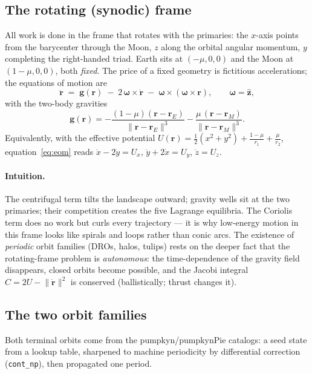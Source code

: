 \documentclass[11pt]{article}
\newcommand{\Rv}{\bm{r}}
\begin{document}
\subsection{The rotating (synodic) frame}

All work is done in the frame that rotates with the primaries: the $x$-axis
points from the barycenter through the Moon, $z$ along the orbital angular
momentum, $y$ completing the right-handed triad. Earth sits at $(-\mu,0,0)$
and the Moon at $(1-\mu,0,0)$, both \emph{fixed}. The price of a fixed
geometry is fictitious accelerations; the equations of motion are
\begin{equation}
\ddot{\Rv} \;=\; \bm g(\Rv)
\;-\; 2\,\bm\omega\times\dot{\Rv}
\;-\; \bm\omega\times(\bm\omega\times\Rv),
\qquad \bm\omega = \hat{\bm z},
\label{eq:eom}
\end{equation}
with the two-body gravities
\begin{equation}
\bm g(\Rv) = -\frac{(1-\mu)(\Rv - \Rv_E)}{\lVert \Rv-\Rv_E\rVert^{3}}
             -\frac{\mu\,(\Rv - \Rv_M)}{\lVert \Rv-\Rv_M\rVert^{3}} .
\end{equation}
Equivalently, with the effective potential
$U(\Rv)=\tfrac12(x^2+y^2)+\frac{1-\mu}{r_1}+\frac{\mu}{r_2}$,
equation~\eqref{eq:eom} reads $\ddot x - 2\dot y = U_x$,
$\ddot y + 2\dot x = U_y$, $\ddot z = U_z$.

\paragraph{Intuition.} The centrifugal term tilts the landscape outward;
gravity wells sit at the two primaries; their competition creates the five
Lagrange equilibria. The Coriolis term does no work but curls every
trajectory --- it is why low-energy motion in this frame looks like
spirals and loops rather than conic arcs. The existence of \emph{periodic}
orbit families (DROs, halos, tulips) rests on the deeper fact that the
rotating-frame problem is \emph{autonomous}: the time-dependence of the
gravity field disappears, closed orbits become possible, and the Jacobi
integral
$C = 2U - \lVert\dot{\Rv}\rVert^2$ is conserved (ballistically; thrust
changes it).

\subsection{The two orbit families}

Both terminal orbits come from the pumpkyn/pumpkynPie catalogs: a seed
state from a lookup table, sharpened to machine periodicity by differential
correction (\texttt{cont\_np}), then propagated one period.
\end{document}
